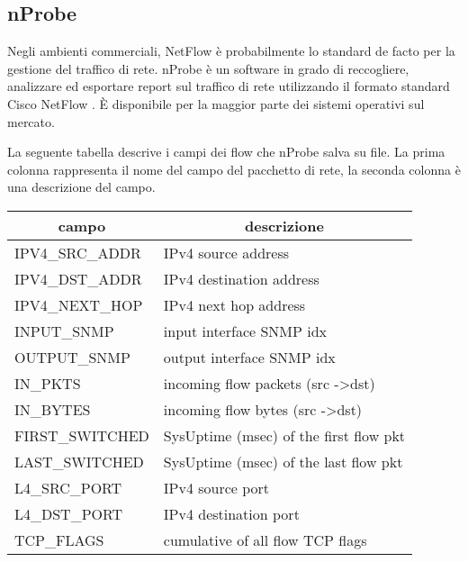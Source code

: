 \documentclass[../main.tex]{subfiles}
\begin{document}
\subsection{nProbe}

Negli ambienti commerciali, NetFlow è probabilmente lo standard de facto per la gestione del traffico di rete. nProbe è un software in grado di reccogliere, analizzare ed esportare report sul traffico di rete utilizzando il formato standard Cisco NetFlow \cite{nProbe}. È disponibile per la maggior parte dei sistemi operativi sul mercato. 

La seguente tabella descrive i campi dei flow che nProbe salva su file. La prima colonna rappresenta il nome del campo del pacchetto di rete, la seconda colonna è una descrizione del campo.

\begin{table}[H]
				\centering
\begin{tabular}{|l|l|}
\hline
\multicolumn{1}{|c|}{\textbf{campo}} & \multicolumn{1}{c|}{\textbf{descrizione}}     \\ \hline
IPV4\_SRC\_ADDR                      & IPv4 source address                           \\ \hline
IPV4\_DST\_ADDR                      & IPv4 destination address                      \\ \hline
IPV4\_NEXT\_HOP                      & IPv4 next hop address                         \\ \hline
INPUT\_SNMP                          & input interface SNMP idx                      \\ \hline
OUTPUT\_SNMP                         & output interface SNMP idx                     \\ \hline
IN\_PKTS                             & incoming flow packets (src -\textgreater dst) \\ \hline
IN\_BYTES                            & incoming flow bytes (src -\textgreater dst)   \\ \hline
FIRST\_SWITCHED                      & SysUptime (msec) of the first flow pkt        \\ \hline
LAST\_SWITCHED                       & SysUptime (msec) of the last flow pkt         \\ \hline
L4\_SRC\_PORT                        & IPv4 source port                              \\ \hline
L4\_DST\_PORT                        & IPv4 destination port                         \\ \hline
TCP\_FLAGS                           & cumulative of all flow TCP flags              \\ \hline

\end{tabular}
\end{table}
\end{document}

